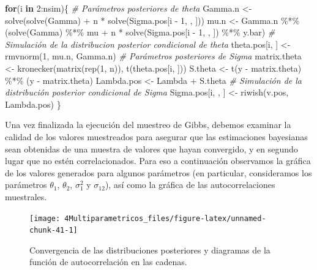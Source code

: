 \documentclass[
  10pt,
  spanish,
]{book}
\newenvironment{Shaded}{\begin{snugshade}}{\end{snugshade}}
\newcommand{\CommentTok}[1]{\textcolor[rgb]{0.56,0.35,0.01}{\textit{#1}}}
\newcommand{\ControlFlowTok}[1]{\textcolor[rgb]{0.13,0.29,0.53}{\textbf{#1}}}
\newcommand{\DecValTok}[1]{\textcolor[rgb]{0.00,0.00,0.81}{#1}}
\newcommand{\FunctionTok}[1]{\textcolor[rgb]{0.00,0.00,0.00}{#1}}
\newcommand{\NormalTok}[1]{#1}
\newcommand{\OtherTok}[1]{\textcolor[rgb]{0.56,0.35,0.01}{#1}}
\newcommand{\SpecialCharTok}[1]{\textcolor[rgb]{0.00,0.00,0.00}{#1}}
\theoremstyle{definition}
\theoremstyle{definition}
\theoremstyle{definition}
\theoremstyle{definition}
\theoremstyle{remark}
\begin{document}
\begin{Shaded}
\begin{Highlighting}[]
\ControlFlowTok{for}\NormalTok{(i }\ControlFlowTok{in} \DecValTok{2}\SpecialCharTok{:}\NormalTok{nsim)\{}
  \CommentTok{\# Parámetros posteriores de theta }
\NormalTok{  Gamma.n }\OtherTok{\textless{}{-}} \FunctionTok{solve}\NormalTok{(}\FunctionTok{solve}\NormalTok{(Gamma) }\SpecialCharTok{+} 
\NormalTok{                     n }\SpecialCharTok{*} \FunctionTok{solve}\NormalTok{(Sigma.pos[i }\SpecialCharTok{{-}} \DecValTok{1}\NormalTok{, , ]))}
\NormalTok{  mu.n }\OtherTok{\textless{}{-}}\NormalTok{ Gamma.n }\SpecialCharTok{\%*\%}
\NormalTok{    (}\FunctionTok{solve}\NormalTok{(Gamma) }\SpecialCharTok{\%*\%}\NormalTok{ mu }\SpecialCharTok{+} 
\NormalTok{       n }\SpecialCharTok{*} \FunctionTok{solve}\NormalTok{(Sigma.pos[i }\SpecialCharTok{{-}} \DecValTok{1}\NormalTok{, , ]) }\SpecialCharTok{\%*\%}\NormalTok{ y.bar)}
  \CommentTok{\# Simulación de la distribucion posterior condicional de theta}
\NormalTok{  theta.pos[i, ] }\OtherTok{\textless{}{-}} \FunctionTok{rmvnorm}\NormalTok{(}\DecValTok{1}\NormalTok{, mu.n, Gamma.n)}
  \CommentTok{\# Parámetros posteriores de Sigma}
\NormalTok{  matrix.theta }\OtherTok{\textless{}{-}} \FunctionTok{kronecker}\NormalTok{(}\FunctionTok{matrix}\NormalTok{(}\FunctionTok{rep}\NormalTok{(}\DecValTok{1}\NormalTok{, n)),}
                          \FunctionTok{t}\NormalTok{(theta.pos[i, ]))  }
\NormalTok{  S.theta }\OtherTok{\textless{}{-}} \FunctionTok{t}\NormalTok{(y }\SpecialCharTok{{-}}\NormalTok{ matrix.theta) }\SpecialCharTok{\%*\%}\NormalTok{ (y }\SpecialCharTok{{-}}\NormalTok{ matrix.theta)}
\NormalTok{  Lambda.pos }\OtherTok{\textless{}{-}}\NormalTok{ Lambda }\SpecialCharTok{+}\NormalTok{ S.theta}
  \CommentTok{\# Simulación de la distribución posterior condicional de Sigma}
\NormalTok{  Sigma.pos[i, , ] }\OtherTok{\textless{}{-}} \FunctionTok{riwish}\NormalTok{(v.pos, Lambda.pos)}
\NormalTok{\}}
\end{Highlighting}
\end{Shaded}

Una vez finalizada la ejecución del muestreo de Gibbs, debemos examinar la calidad de los valores muestreados para asegurar que las estimaciones bayesianas sean obtenidas de una muestra de valores que hayan convergido, y en segundo lugar que no estén correlacionados. Para eso a continuación observamos la gráfica de los valores generados para algunos parámetros (en particular, consideramos los parámetros \(\theta_1\), \(\theta_2\), \(\sigma^2_1\) y \(\sigma_{12}\)), así como la gráfica de las autocorrelaciones muestrales.

\begin{figure}

{\centering \texttt{[image: 4Multiparametricos\_files/figure-latex/unnamed-chunk-41-1]} 

}

\caption{Convergencia de las distribuciones posteriores y diagramas de la función de autocorrelación en las cadenas.}\label{fig:unnamed-chunk-41}
\end{figure}
\end{document}

